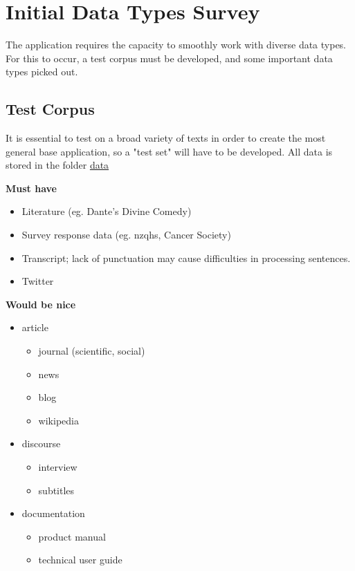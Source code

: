 \documentclass[a4paper, 11pt]{article}
\begin{document}
\section{Initial Data Types Survey}
\label{sec:orgbe7fb9e}
The application requires the capacity to smoothly work with diverse
data types. For this to occur, a test corpus must be developed, and
some important data types picked out.
\subsection{Test Corpus}
\label{sec:org4cae160}
It is essential to test on a broad variety of texts in order to create
the most general base application, so a "test set" will have to be
developed. All data is stored in the folder \href{c:/Users/User/Desktop/stats-781/data}{data}

\textbf{Must have}

\begin{itemize}
\item Literature (eg. Dante's Divine Comedy)
\item Survey response data (eg. nzqhs, Cancer Society)
\item Transcript; lack of punctuation may cause difficulties in processing
sentences.
\item Twitter
\end{itemize}

\textbf{Would be nice}

\begin{itemize}
\item article
\begin{itemize}
\item journal (scientific, social)
\item news
\item blog
\item wikipedia
\end{itemize}
\item discourse
\begin{itemize}
\item interview
\item subtitles
\end{itemize}
\item documentation
\begin{itemize}
\item product manual
\item technical user guide
\end{itemize}
\end{itemize}
\end{document}
